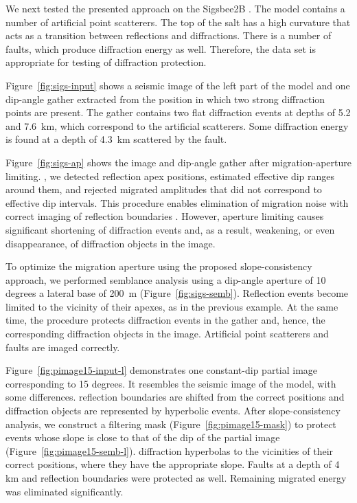 We next tested the presented approach on  the Sigsbee2B  \cite[]{paffenholz02}.
The model contains a number of artificial point scatterers. The top of the salt  has a high curvature that acts as a transition between 
reflections and diffractions. There is a number of faults, which produce diffraction energy as well. Therefore, the data set is 
appropriate for testing of diffraction protection.

Figure~\ref{fig:sigs-input} shows a seismic image of the left part of the model and one dip-angle gather 
extracted from the position
in which two strong diffraction points are present. The gather contains two flat diffraction events at depths of 5.2 and 7.6~km,
which correspond to the artificial scatterers. Some diffraction energy is  found at a depth of 4.3~km scattered by the fault.

Figure~\ref{fig:sigs-ap} shows the image and dip-angle gather after migration-aperture limiting. , we detected reflection apex positions,
estimated effective dip ranges around them, and rejected migrated amplitudes that did not correspond to effective dip intervals. This procedure enables
elimination of migration noise with correct imaging of reflection boundaries \cite[]{bienati09}. However, aperture limiting causes significant shortening 
of diffraction events and, as a result, weakening, or even disappearance, of diffraction objects in the image.

To optimize the migration aperture using the proposed slope-consistency approach, we performed semblance analysis using a dip-angle
aperture of 10 degrees \new{,} a lateral base of 200~m
(Figure~\ref{fig:sigs-semb}). Reflection events become limited to the vicinity of their apexes, as in the
previous example. At the same time, the procedure protects diffraction events in the gather and, hence, the corresponding 
diffraction objects in the image. Artificial point scatterers and faults are imaged correctly.

Figure~\ref{fig:pimage15-input-l}
demonstrates one constant-dip partial image corresponding to 15 degrees. It resembles the seismic
image of the model, with some differences.  reflection boundaries are shifted from the correct positions and diffraction objects
are represented by hyperbolic events. After slope-consistency analysis, we construct a filtering mask (Figure~\ref{fig:pimage15-mask})
to protect events whose slope is close to that of the dip of the partial image (Figure~\ref{fig:pimage15-semb-l}).
 diffraction hyperbolas  to the vicinities of their correct positions, where they have
the appropriate slope. Faults at a depth of 4 km and  reflection boundaries were protected as well. Remaining migrated energy was eliminated 
significantly.

